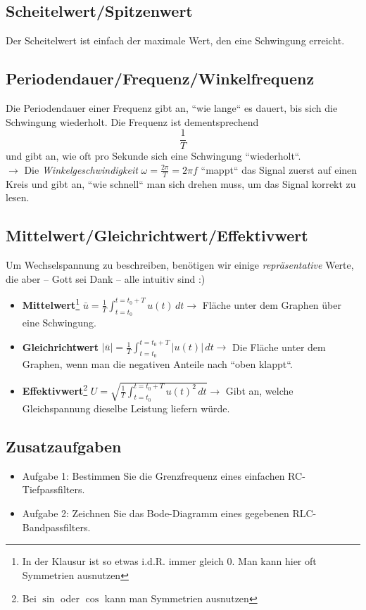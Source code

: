 \documentclass[11pt,a4paper]{article}
\begin{document}
\subsection{Scheitelwert/Spitzenwert}
Der Scheitelwert ist einfach der maximale Wert, den eine Schwingung erreicht.

\subsection{Periodendauer/Frequenz/Winkelfrequenz}
Die Periodendauer einer Frequenz gibt an, ``wie lange`` es dauert, bis sich die Schwingung wiederholt. Die Frequenz ist dementsprechend
\[
\frac{1}{T}
\]
und gibt an, wie oft pro Sekunde sich eine Schwingung ``wiederholt``. \\
\( \rightarrow \) Die \textit{Winkelgeschwindigkeit} \( \omega=\frac{2\pi}{T} = 2\pi f \) ``mappt`` das Signal zuerst auf einen Kreis und gibt an, ``wie schnell`` man sich drehen muss, um das Signal korrekt zu lesen.

\subsection{Mittelwert/Gleichrichtwert/Effektivwert}
Um Wechselspannung zu beschreiben, benötigen wir einige \textit{repräsentative} Werte, die aber – Gott sei Dank – alle intuitiv sind :)

\begin{itemize}
    \item \textbf{Mittelwert}\footnote{In der Klausur ist so etwas i.d.R. immer gleich 0. Man kann hier oft Symmetrien ausnutzen} \quad \( \bar{u} = \frac{1}{T} \int_{t=t_0}^{t=t_0+T} u(t) \, dt \rightarrow \) Fläche unter dem Graphen über eine Schwingung.
    
    \item \textbf{Gleichrichtwert} \quad \( |\bar{u}| = \frac{1}{T} \int_{t=t_0}^{t=t_0+T} |u(t)| \, dt \rightarrow \) Die Fläche unter dem Graphen, wenn man die negativen Anteile nach ``oben klappt``.
    
    \item \textbf{Effektivwert}\footnote{Bei \( \sin \) oder \( \cos \) kann man Symmetrien ausnutzen} \quad \( U = \sqrt{\frac{1}{T} \int_{t=t_0}^{t=t_0+T} u(t)^2 \, dt} \rightarrow \) Gibt an, welche Gleichspannung dieselbe Leistung liefern würde.
\end{itemize}

\subsection{Zusatzaufgaben}
\begin{itemize}
    \item Aufgabe 1: Bestimmen Sie die Grenzfrequenz eines einfachen RC-Tiefpassfilters.
    \item Aufgabe 2: Zeichnen Sie das Bode-Diagramm eines gegebenen RLC-Bandpassfilters.
\end{itemize}
\end{document}
